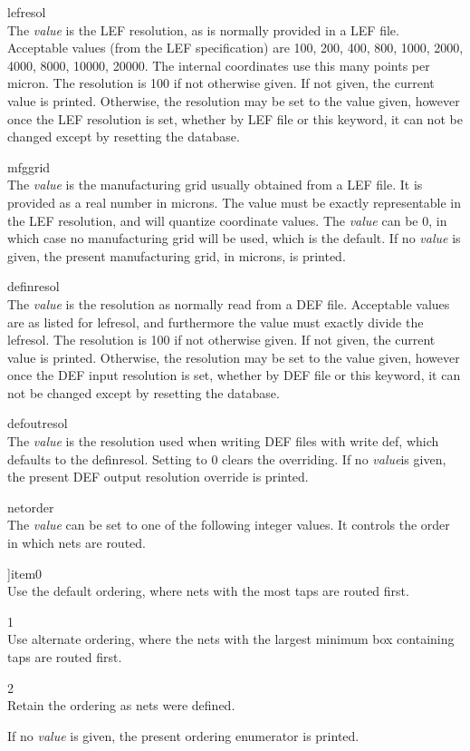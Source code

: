 \begin{description}
\item{\vt lefresol}\\
The {\it value} is the LEF resolution, as is normally provided in a
LEF file.  Acceptable values (from the LEF specification) are 100,
200, 400, 800, 1000, 2000, 4000, 8000, 10000, 20000.  The internal
coordinates use this many points per micron.  The resolution is 100
if not otherwise given.  If not given, the current value is printed. 
Otherwise, the resolution may be set to the value given, however once
the LEF resolution is set, whether by LEF file or this keyword, it
can not be changed except by resetting the database.

\item{\vt mfggrid}\\
The {\it value} is the manufacturing grid usually obtained from a LEF
file.  It is provided as a real number in microns.  The value must be
exactly representable in the LEF resolution, and will quantize
coordinate values.  The {\it value} can be 0, in which case no
manufacturing grid will be used, which is the default.  If no {\it
value} is given, the present manufacturing grid, in microns, is
printed.

\item{\vt definresol}\\
The {\it value} is the resolution as normally read from a DEF file. 
Acceptable values are as listed for {\vt lefresol}, and furthermore
the value must exactly divide the {\vt lefresol}.  The resolution is
100 if not otherwise given.  If not given, the current value is
printed.  Otherwise, the resolution may be set to the value given,
however once the DEF input resolution is set, whether by DEF file or
this keyword, it can not be changed except by resetting the database.

\item{\vt defoutresol}\\
The {\it value} is the resolution used when writing DEF files with
{\vt write def}, which defaults to the {\vt definresol}.  Setting to
0 clears the overriding.  If no {\it value}is given, the present DEF
output resolution override is printed.

\item{\vt netorder}\\
The {\it value} can be set to one of the following integer values. 
It controls the order in which nets are routed.
\begin{description}
]item{0}\\
Use the default ordering, where nets with the most taps are routed
first.
\item{1}\\
Use alternate ordering, where the nets with the largest minimum box
containing taps are routed first.
\item{2}\\
Retain the ordering as nets were defined.
\end{description}
If no {\it value} is given, the present ordering enumerator is
printed.


\end{description}
